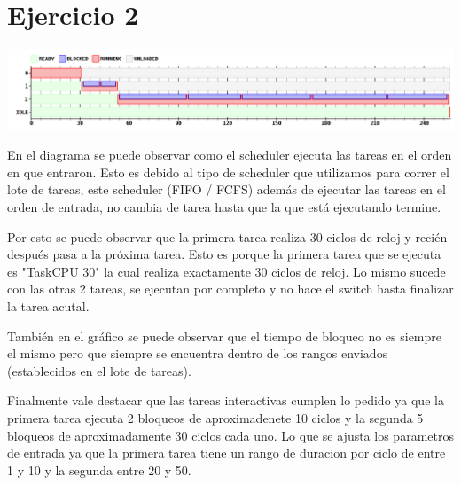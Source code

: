 \section{Ejercicio 2}

\begin {center}
\includegraphics[width=16cm]{../simusched/outputs/outEj2.png}
\end {center}


En el diagrama se puede observar como el scheduler ejecuta las tareas en el orden en que entraron. Esto es debido al tipo de scheduler que utilizamos para correr el lote de tareas, este scheduler (FIFO / FCFS) además de ejecutar las tareas en el orden de entrada, no cambia de tarea hasta que la que está ejecutando termine. 

Por esto se puede observar que la primera tarea realiza 30 ciclos de reloj y recién después pasa a la próxima tarea. Esto es porque la primera tarea que se ejecuta es "TaskCPU 30" la cual realiza exactamente 30 ciclos de reloj. Lo mismo sucede con las otras 2 tareas, se ejecutan por completo y no hace el switch hasta finalizar la tarea acutal.

También en el gráfico se puede observar que el tiempo de bloqueo no es siempre el mismo pero que siempre se encuentra dentro de los rangos enviados (establecidos en el lote de tareas).

Finalmente vale destacar que las tareas interactivas cumplen lo pedido ya que la primera tarea ejecuta 2 bloqueos de aproximadenete 10 ciclos y la segunda 5 bloqueos de aproximadamente 30 ciclos cada uno. Lo que se ajusta los parametros de entrada ya que la primera tarea tiene un rango de duracion por ciclo de entre 1 y 10 y la segunda entre 20 y 50.
